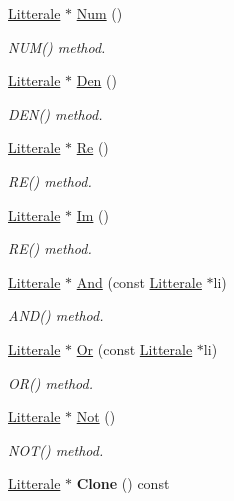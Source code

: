 \begin{DoxyCompactItemize}
\hyperlink{class_litterale}{Litterale} $\ast$ \hyperlink{class_li_reelle_aa4184e221af015edfb3e53cede494746}{Num} ()
\begin{DoxyCompactList}\small\item\em N\+U\+M() method. \end{DoxyCompactList}\item 
\hyperlink{class_litterale}{Litterale} $\ast$ \hyperlink{class_li_reelle_a546d4b22265cb69d2273bd62506ba55b}{Den} ()
\begin{DoxyCompactList}\small\item\em D\+E\+N() method. \end{DoxyCompactList}\item 
\hyperlink{class_litterale}{Litterale} $\ast$ \hyperlink{class_li_reelle_ad7c72bce1be331de508c60eee2800b4a}{Re} ()
\begin{DoxyCompactList}\small\item\em R\+E() method. \end{DoxyCompactList}\item 
\hyperlink{class_litterale}{Litterale} $\ast$ \hyperlink{class_li_reelle_a0e873df9175f1cd776529a0f2c00dcc4}{Im} ()
\begin{DoxyCompactList}\small\item\em R\+E() method. \end{DoxyCompactList}\item 
\hyperlink{class_litterale}{Litterale} $\ast$ \hyperlink{class_li_reelle_a02ffab7d9d66a3d19845155604d61611}{And} (const \hyperlink{class_litterale}{Litterale} $\ast$li)
\begin{DoxyCompactList}\small\item\em A\+N\+D() method. \end{DoxyCompactList}\item 
\hyperlink{class_litterale}{Litterale} $\ast$ \hyperlink{class_li_reelle_a0b55f57589414fdcea4120d9971cb837}{Or} (const \hyperlink{class_litterale}{Litterale} $\ast$li)
\begin{DoxyCompactList}\small\item\em O\+R() method. \end{DoxyCompactList}\item 
\hyperlink{class_litterale}{Litterale} $\ast$ \hyperlink{class_li_reelle_a85e6a8f3389148978a21dc70774d66e4}{Not} ()
\begin{DoxyCompactList}\small\item\em N\+O\+T() method. \end{DoxyCompactList}\item 
\hyperlink{class_litterale}{Litterale} $\ast$ {\bfseries Clone} () const \hypertarget{class_li_reelle_a7e55e5066460ea32836d262e7df03721}{}\label{class_li_reelle_a7e55e5066460ea32836d262e7df03721}

\end{DoxyCompactItemize}


